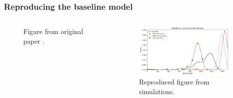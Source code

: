 \documentclass[8pt]{beamer}
\begin{document}
\begin{frame}
\frametitle{Reproducing the baseline model}




\begin{columns}[h]

    \begin{column}{6cm}
        \begin{figure}[h]
   \centering
 \caption*{Figure from original paper \cite{manore_network-patch_2015}.}
\end{figure}
    \end{column}

    


    
    \begin{column}{6cm}
        \begin{figure}[h]
   \centering
   \includegraphics[width=6cm]{figs/repr_repr.png}
 \caption*{Reproduced figure from simulations.}
\end{figure}
    \end{column}

\end{columns}


\end{frame}
\end{document}
